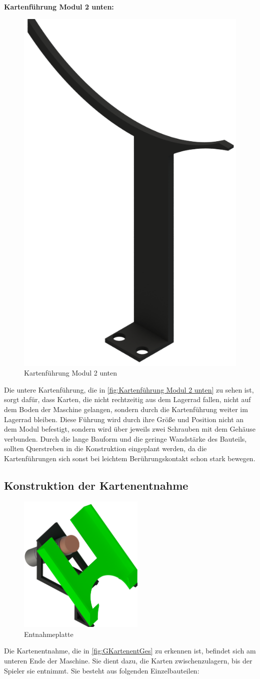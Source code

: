 \textbf{Kartenführung Modul 2 unten:}

\begin{figure}[H]
    \centering
    \includegraphics[width=6 cm]{fig/mech/FuehrungPLAUntenRechts}
    \caption{Kartenführung Modul 2 unten}
    \label{fig:Kartenführung Modul 2 unten}
\end{figure}

Die untere Kartenführung, die in \autoref{fig:Kartenführung Modul 2 unten} zu sehen ist, sorgt dafür, dass Karten, die nicht rechtzeitig aus dem Lagerrad fallen, nicht auf dem Boden der Maschine gelangen,
sondern durch die Kartenführung weiter im Lagerrad bleiben.
Diese Führung wird durch ihre Größe und Position nicht an dem Modul befestigt, sondern wird über jeweils zwei Schrauben mit dem Gehäuse
verbunden.
Durch die lange Bauform und die geringe Wandstärke des Bauteils, sollten Querstreben in die Konstruktion eingeplant werden,
da die Kartenführungen sich sonst bei leichtem Berührungskontakt schon stark bewegen.

\pagebreak
\subsection{Konstruktion der Kartenentnahme}
\begin{figure}[H]
    \centering
    \includegraphics[width = 6cm]{fig/mech/AusgabeKomlett}
    \caption{Entnahmeplatte}
    \label{fig:GKartenentGes}
\end{figure}
Die Kartenentnahme, die in \autoref{fig:GKartenentGes} zu erkennen ist, befindet sich am unteren Ende der Maschine. Sie dient dazu, die Karten zwischenzulagern, bis der Spieler
sie entnimmt. Sie besteht aus folgenden Einzelbauteilen:\\

